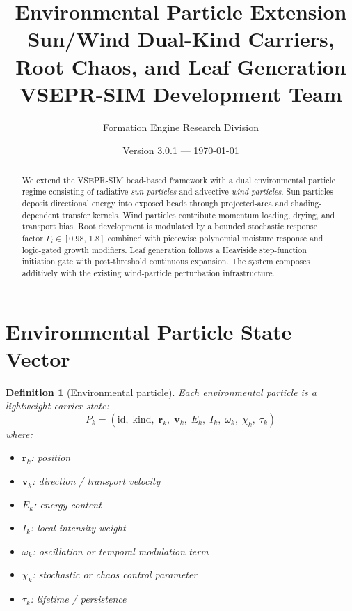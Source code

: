 \documentclass[11pt]{article}
\title{\textbf{Environmental Particle Extension} \\[6pt]
\Large Sun/Wind Dual-Kind Carriers, Root Chaos, and Leaf Generation \\[6pt]
\large VSEPR-SIM Development Team}
\author{Formation Engine Research Division}
\date{Version 3.0.1 --- \today}
\newtheorem{definition}{Definition}[section]
\begin{document}
\maketitle
\thispagestyle{fancy}

\begin{abstract}
We extend the VSEPR-SIM bead-based framework with a dual environmental
particle regime consisting of radiative \emph{sun particles} and advective
\emph{wind particles}.  Sun particles deposit directional energy into
exposed beads through projected-area and shading-dependent transfer
kernels.  Wind particles contribute momentum loading, drying, and
transport bias.  Root development is modulated by a bounded stochastic
response factor $\Gamma_i \in [0.98,\,1.8]$ combined with piecewise
polynomial moisture response and logic-gated growth modifiers.  Leaf
generation follows a Heaviside step-function initiation gate with
post-threshold continuous expansion.  The system composes additively
with the existing wind-particle perturbation infrastructure.
\end{abstract}

\tableofcontents
\newpage

\section{Environmental Particle State Vector}

\begin{definition}[Environmental particle]
Each environmental particle is a lightweight carrier state:
\begin{equation}
  P_k = (\mathrm{id},\;\mathrm{kind},\;\mathbf{r}_k,\;\mathbf{v}_k,\;
         E_k,\;I_k,\;\omega_k,\;\chi_k,\;\tau_k)
\end{equation}
where:
\begin{itemize}
  \item $\mathbf{r}_k$: position
  \item $\mathbf{v}_k$: direction / transport velocity
  \item $E_k$: energy content
  \item $I_k$: local intensity weight
  \item $\omega_k$: oscillation or temporal modulation term
  \item $\chi_k$: stochastic or chaos control parameter
  \item $\tau_k$: lifetime / persistence
\end{itemize}
\end{definition}
\end{document}
